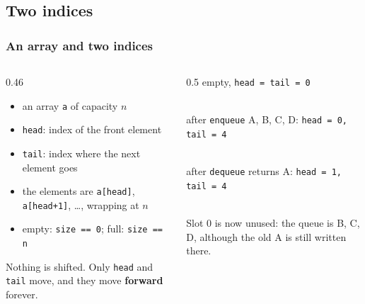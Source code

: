 \documentclass[aspectratio=169,10pt,compress]{beamer}
\begin{document}

\subsection[Idea]{Two indices}




\begin{frame}[t,fragile] \frametitle{An array and two indices}
  \begin{columns}[T]
    \begin{column}{0.46\textwidth}
      \begin{itemize}
        \item an array \texttt{a} of capacity $n$
        \item \texttt{head}: index of the front element
        \item \texttt{tail}: index where the next element goes
        \item the elements are \texttt{a[head]}, \texttt{a[head+1]}, \dots, wrapping at $n$
        \item empty: \texttt{size == 0}; full: \texttt{size == n}
      \end{itemize}
      \vspace{0.3em}
      \small Nothing is shifted. Only \texttt{head} and \texttt{tail} move, and they move \textbf{forward} forever.
    \end{column}
    \begin{column}{0.5\textwidth}
      \small empty, \texttt{head = tail = 0}\\
      \\[0.3em]
      after \texttt{enqueue} A, B, C, D: \texttt{head = 0, tail = 4}\\
      \\[0.3em]
      after \texttt{dequeue} returns A: \texttt{head = 1, tail = 4}\\
      \\[0.2em]
      \tiny Slot 0 is now unused: the queue is B, C, D, although the old A is still written there.
    \end{column}
  \end{columns}
\end{frame}
\end{document}
